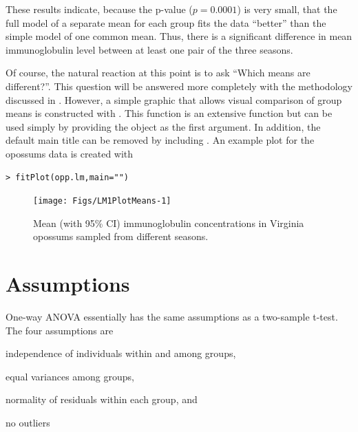 \documentclass[10pt,openany]{book}\usepackage[]{graphicx}\usepackage[]{color}
\makeatletter
\newenvironment{kframe}{%
 \def\at@end@of@kframe{}%
 \ifinner\ifhmode%
  \def\at@end@of@kframe{\end{minipage}}%
  \begin{minipage}{\columnwidth}%
 \fi\fi%
 \def\FrameCommand##1{\hskip\@totalleftmargin \hskip-\fboxsep
 \colorbox{shadecolor}{##1}\hskip-\fboxsep
     \hskip-\linewidth \hskip-\@totalleftmargin \hskip\columnwidth}%
 \MakeFramed {\advance\hsize-\width
   \@totalleftmargin\z@ \linewidth\hsize
   \@setminipage}}%
 {\par\unskip\endMakeFramed%
 \at@end@of@kframe}
\newenvironment{knitrout}{}{} %
\makeatother
\begin{document}
These results indicate, because the p-value ($p=0.0001$) is very small, that the full model of a separate mean for each group fits the data ``better'' than the simple model of one common mean.  Thus, there is a significant difference in mean immunoglobulin level between at least one pair of the three seasons.

Of course, the natural reaction at this point is to ask ``Which means are different?''.  This question will be answered more completely with the methodology discussed in .  However, a simple graphic that allows visual comparison of group means is constructed with .  This function is an extensive function but can be used simply by providing the  object as the first argument.  In addition, the default main title can be removed by including .  An example plot for the opossums data  is created with

\begin{knitrout}
\color{fgcolor}\begin{kframe}
\begin{verbatim}
> fitPlot(opp.lm,main="")
\end{verbatim}
\end{kframe}\begin{figure}[hbtp]

{\centering \texttt{[image: Figs/LM1PlotMeans-1]} 

}

\caption[Mean (with 95\% CI) immunoglobulin concentrations in Virginia opossums sampled from different seasons]{Mean (with 95\% CI) immunoglobulin concentrations in Virginia opossums sampled from different seasons.}\label{fig:LM1PlotMeans}
\end{figure}


\end{knitrout}

\section{Assumptions} \label{sect:OWAAssumptions}
One-way ANOVA essentially has the same assumptions as a two-sample t-test.  The four assumptions are
\begin{Enumerate}
  \item independence of individuals within and among groups,
  \item equal variances among groups,
  \item normality of residuals within each group, and
  \item no outliers
\end{Enumerate}
\end{document}
